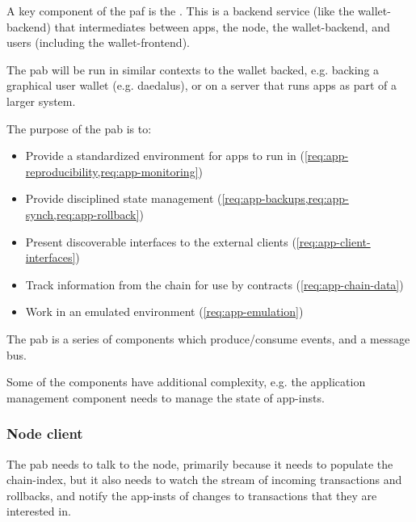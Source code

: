 \medskip

A key component of the \gls{paf} is the .
This is a backend service (like the \gls{wallet-backend}) that intermediates between \glspl{app}, the \gls{node}, the \gls{wallet-backend}, and users (including the \gls{wallet-frontend}).

The \gls{pab} will be run in similar contexts to the wallet backed, e.g. backing a graphical user wallet (e.g. \gls{daedalus}), or on a server that runs \glspl{app} as part of a larger system.

The purpose of the \gls{pab} is to:
\begin{itemize}
\item Provide a standardized environment for \glspl{app} to run in (\cref{req:app-reproducibility,req:app-monitoring})
\item Provide disciplined state management (\cref{req:app-backups,req:app-synch,req:app-rollback})
\item Present discoverable interfaces to the external clients (\cref{req:app-client-interfaces})
\item Track information from the chain for use by contracts (\cref{req:app-chain-data})
\item Work in an emulated environment (\cref{req:app-emulation})
\end{itemize}

The \gls{pab} is a series of components which produce/consume events, and a message bus.

Some of the components have additional complexity, e.g. the application management component needs to manage the state of \glspl{app-inst}.

\subsubsection{Node client}
The \gls{pab} needs to talk to the \gls{node}, primarily because it needs to populate the \gls{chain-index}, but it also needs to watch the stream of incoming transactions and rollbacks, and notify the \glspl{app-inst} of changes to transactions that they are interested in.

